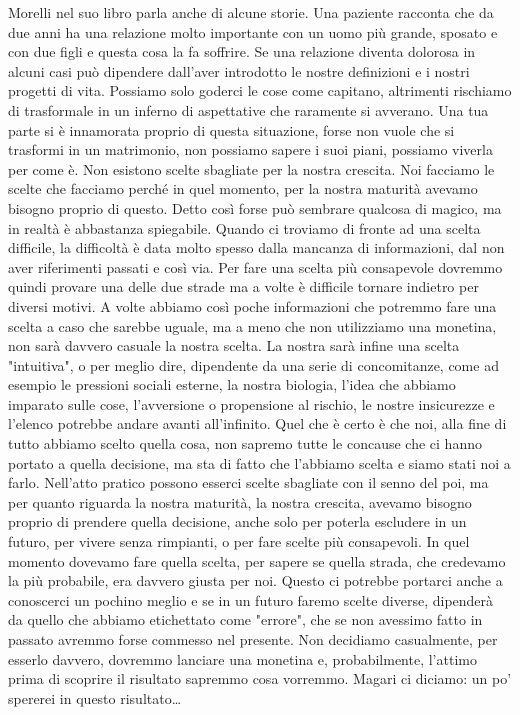 \documentclass[12pt]{book} %
\begin{document}
Morelli nel suo libro parla anche di alcune storie. Una paziente racconta che da due anni ha una relazione molto
importante con un uomo più grande, sposato e con due figli e questa cosa la fa soffrire. Se una relazione diventa
dolorosa in alcuni casi può dipendere dall'aver introdotto le nostre definizioni e i nostri progetti di vita. Possiamo solo goderci le cose
come capitano, altrimenti rischiamo di trasformale in un inferno di aspettative che raramente si avverano. Una tua
parte si è innamorata proprio di questa situazione, forse non vuole che si trasformi in un matrimonio, non possiamo
sapere i suoi piani, possiamo viverla per come è. Non esistono scelte sbagliate per la nostra crescita. Noi facciamo le
scelte che facciamo perché in quel momento, per la nostra maturità avevamo bisogno proprio di questo. 
Detto così forse può sembrare qualcosa di magico, ma in realtà è abbastanza spiegabile. Quando ci troviamo di fronte ad una scelta difficile, la difficoltà è data molto spesso dalla mancanza di informazioni, dal non aver riferimenti passati e così via. Per fare una scelta più consapevole dovremmo quindi provare una delle due strade ma a volte è difficile tornare indietro per diversi motivi. A volte abbiamo così poche informazioni che potremmo fare una scelta a caso che sarebbe uguale, ma a meno che non utilizziamo una monetina, non sarà davvero casuale la nostra scelta. La nostra sarà infine una scelta "intuitiva", o per meglio dire, dipendente da una serie di concomitanze, come ad esempio le pressioni sociali esterne, la nostra biologia, l'idea che abbiamo imparato sulle cose, l'avversione o propensione al rischio, le nostre insicurezze e l'elenco potrebbe andare avanti all'infinito. Quel che è certo è che noi, alla fine di tutto abbiamo scelto quella cosa, non sapremo tutte le concause che ci hanno portato a quella decisione, ma sta di fatto che l'abbiamo scelta e siamo stati noi a farlo. Nell'atto pratico possono esserci scelte sbagliate con il senno del poi, ma per quanto riguarda la nostra maturità, la nostra crescita, avevamo bisogno proprio di prendere quella decisione, anche solo per poterla escludere in un futuro, per vivere senza rimpianti, o per fare scelte più consapevoli. In quel momento dovevamo fare quella scelta, per sapere se quella strada, che credevamo la più probabile, era davvero giusta per noi. Questo ci potrebbe portarci anche a conoscerci un pochino meglio e se in un futuro faremo scelte diverse, dipenderà da quello che abbiamo etichettato come "errore", che se non avessimo fatto in passato avremmo forse commesso nel presente. Non decidiamo casualmente, per esserlo davvero, dovremmo lanciare una monetina e, probabilmente, l'attimo prima di scoprire il risultato sapremmo cosa vorremmo. Magari ci diciamo: un po' spererei in questo risultato… 
\end{document}
